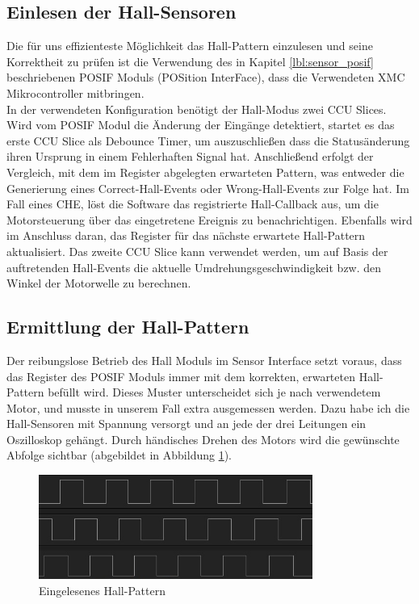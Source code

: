 \subsection{Einlesen der Hall-Sensoren}
Die für uns effizienteste Möglichkeit das Hall-Pattern einzulesen und seine Korrektheit zu prüfen ist die Verwendung des in Kapitel \ref{lbl:sensor_posif} beschriebenen POSIF Moduls (POSition InterFace), dass die Verwendeten XMC Mikrocontroller mitbringen.\\

\noindent
In der verwendeten Konfiguration benötigt der Hall-Modus zwei CCU Slices. Wird vom POSIF Modul die Änderung der Eingänge detektiert, startet es das erste CCU Slice als Debounce Timer, um auszuschließen dass die Statusänderung ihren Ursprung in einem Fehlerhaften Signal hat. Anschließend erfolgt der Vergleich, mit dem im Register abgelegten erwarteten Pattern, was entweder die Generierung eines Correct-Hall-Events oder Wrong-Hall-Events zur Folge hat. Im Fall eines CHE, löst die Software das registrierte Hall-Callback aus, um die Motorsteuerung über das eingetretene Ereignis zu benachrichtigen. Ebenfalls wird im Anschluss daran, das Register für das nächste erwartete Hall-Pattern aktualisiert. Das zweite CCU Slice kann verwendet werden, um auf Basis der auftretenden Hall-Events die aktuelle Umdrehungsgeschwindigkeit bzw. den Winkel der Motorwelle zu berechnen.

\subsection{Ermittlung der Hall-Pattern}
Der reibungslose Betrieb des Hall Moduls im Sensor Interface setzt voraus, dass das Register des POSIF Moduls immer mit dem korrekten, erwarteten Hall-Pattern befüllt wird. Dieses Muster unterscheidet sich je nach verwendetem Motor, und musste in unserem Fall extra ausgemessen werden. Dazu habe ich die Hall-Sensoren mit Spannung versorgt und an jede der drei Leitungen ein Oszilloskop gehängt. Durch händisches Drehen des Motors wird die gewünschte Abfolge sichtbar (abgebildet in Abbildung \ref{img:hall_pattern}).

\begin{figure}[h]
\centering
\includegraphics[width=0.8\textwidth]{sensor/hall_pattern.jpg}
\caption{Eingelesenes Hall-Pattern}
\label{img:hall_pattern}
\end{figure}

